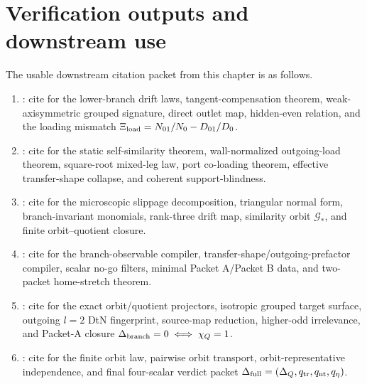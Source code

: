 
\section{Verification outputs and downstream use}
\label{sec:part05-verification-outputs}

The usable downstream citation packet from this chapter is as follows.
\begin{enumerate}[leftmargin=2.2em]
\item {}: cite for the lower-branch drift laws, tangent-compensation theorem, weak-axisymmetric grouped signature, direct outlet map, hidden-even relation, and the loading mismatch \(\Xi_{\rm load}=N_{01}/N_0-D_{01}/D_0\).
\item {}: cite for the static self-similarity theorem, wall-normalized outgoing-load theorem, square-root mixed-leg law, port co-loading theorem, effective transfer-shape collapse, and coherent support-blindness.
\item {}: cite for the microscopic slippage decomposition, triangular normal form, branch-invariant monomials, rank-three drift map, similarity orbit \(\mathcal G_*\), and finite orbit--quotient closure.
\item {}: cite for the branch-observable compiler, transfer-shape/outgoing-prefactor compiler, scalar no-go filters, minimal Packet A/Packet B data, and two-packet home-stretch theorem.
\item {}: cite for the exact orbit/quotient projectors, isotropic grouped target surface, outgoing \(l=2\) DtN fingerprint, source-map reduction, higher-odd irrelevance, and Packet-A closure \(\Delta_{\rm branch}=0\iff\chi_Q=1\).
\item {}: cite for the finite orbit law, pairwise orbit transport, orbit-representative independence, and final four-scalar verdict packet \(\Delta_{\rm full}=(\Delta_Q,q_{\rm tr},q_{\rm nt},q_\eta)\).
\end{enumerate}

